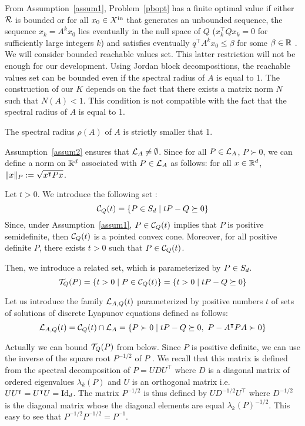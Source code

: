 \documentclass[10pt]{article}
\begin{document}
From Assumption~\ref{assum1}, Problem~\eqref{pbopt} has a finite optimal value if either $\mathcal{R}$ is bounded or for all 
$x_0\in X^\mathrm{in}$ that generates an unbounded sequence, the sequence $x_k=A^k x_0$ lies eventually in the null space of $Q$ ($x_k^\intercal Q x_k=0$ for sufficiently large integers $k$) and satisfies eventually $q^\intercal A^k x_0\leq \beta$ for some $\beta\in\mathbb R$ .  We will consider bounded reachable values set. This latter restriction will not be enough for our development. Using Jordan block decompositions, the reachable values set can be bounded even if the spectral radius of $A$ is equal to 1. The construction of our $K$ depends on the fact that there exists a matrix norm $N$ such that $N(A)<1$. This condition is not compatible with the fact that the spectral radius of $A$ is equal to 1.

\begin{assumption}
\label{assum2}
The spectral radius $\rho(A)$ of $A$ is strictly smaller that 1.
\end{assumption}

Assumption~\ref{assum2} ensures that $\mathcal{L}_{A}\neq \emptyset$. Since for all $P\in\mathcal{L}_{A}$, $P\succ 0$, we can define a norm on $\mathbb R^d$ associated with $P\in\mathcal{L}_{A}$ as follows: for all $x\in\mathbb R^d$, $\| x\|_P:=\sqrt{x^\intercal P x}$. 

Let $t>0$. We introduce the following set :  
\[
\mathcal{C}_{Q}(t)=\{P\in S_d\mid tP-Q\succeq 0\}
\]
Since, under Assumption~\ref{assum1}, $P\in\mathcal{C}_{Q}(t)$ implies that $P$ is positive semidefinite, then $\mathcal{C}_{Q}(t)$ is a pointed convex cone. Moreover, for all positive definite $P$, there exists $t>0$ such that $P\in \mathcal{C}_{Q}(t)$. 

Then, we introduce a related set, which is parameterized by $P\in S_d$.
\[
\mathcal{T}_{Q}(P)=\{t>0\mid P\in\mathcal{C}_{Q}(t) \}=\{t>0\mid tP-Q\succeq 0\}
\]

Let us introduce the family $\mathcal{L}_{A,Q}(t)$ parameterized by positive numbers $t$ of sets of solutions of discrete Lyapunov equations defined as follows:
\[
\mathcal{L}_{A,Q}(t)=\mathcal{C}_{Q}(t)\cap\mathcal{L}_{A}=\{P\succ 0\mid tP-Q\succeq 0,\ P-A^\intercal P A\succ 0\}
\]
\begin{comment}
Finally, we need a third related set . For all $P\succ 0$, we define:

\[
\lyaa{P}=\{t>0\mid P\in\lyat{A,Q}\} 
\]
\end{comment}
Actually we can bound $\mathcal{T}_{Q}(P)$ from below. Since $P$ is positive definite, we can use the inverse of the square root $P^{-1/2}$ of $P$ . We recall that this matrix is defined from the spectral decomposition of $P=U D U^\intercal$ where $D$ is a diagonal  matrix of ordered eigenvalues $\lambda_k(P)$ and $U$ is an orthogonal matrix i.e. $U U^\intercal = U^\intercal U=\operatorname{Id}_d$.   The matrix  $P^{-1/2}$ is thus defined by 
$U D^{-1/2} U^\intercal$ where $D^{-1/2}$ is the diagonal matrix whose the diagonal elements are equal $\lambda_k(P)^{-1/2}$. This easy to see that $P^{-1/2} P^{-1/2}=P^{-1}$. 
\end{document}
